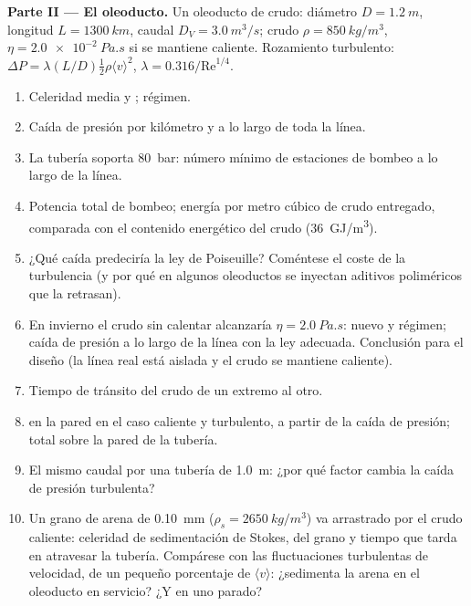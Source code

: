 \begin{problem}
\medskip
\noindent\textbf{Parte II --- El oleoducto.}
Un oleoducto de crudo: diámetro $D = \qty{1.2}{m}$, longitud $L = \qty{1300}{km}$,
caudal $D_V = \qty{3.0}{m^3/s}$; crudo $\rho = \qty{850}{kg/m^3}$, $\eta =
\qty{2.0e-2}{Pa.s}$ si se mantiene caliente. Rozamiento turbulento: $\Delta P = \lambda
(L/D)\tfrac12\rho\langle v\rangle^2$, $\lambda = 0.316/\mathrm{Re}^{1/4}$.
\begin{enumerate}[resume]
  \item Celeridad media y ; régimen.
  \item Caída de presión por kilómetro y a lo largo de toda la línea.
  \item La tubería soporta \qty{80}{bar}: número mínimo de estaciones de
        bombeo a lo largo de la línea.
  \item Potencia total de bombeo; energía por metro cúbico de crudo
        entregado, comparada con el contenido energético del crudo
        (\qty{36}{GJ/m^3}).
  \item ¿Qué caída predeciría la ley de Poiseuille? Coméntese el coste de
        la turbulencia (y por qué en algunos oleoductos se inyectan
        aditivos poliméricos que la retrasan).
  \item En invierno el crudo sin calentar alcanzaría $\eta = \qty{2.0}{Pa.s}$:
        nuevo  y régimen; caída de presión a lo largo de
        la línea con la ley adecuada. Conclusión para el diseño (la línea
        real está aislada y el crudo se mantiene caliente).
  \item Tiempo de tránsito del crudo de un extremo al otro.
  \item {} en la pared en el caso caliente y turbulento, a
        partir de la caída de presión;  total sobre la
        pared de la tubería.
  \item El mismo caudal por una tubería de \qty{1.0}{m}: ¿por qué factor
        cambia la caída de presión turbulenta?
  \item Un grano de arena de \qty{0.10}{mm} ($\rho_s = \qty{2650}{kg/m^3}$) va
        arrastrado por el crudo caliente: celeridad de sedimentación de
        Stokes,  del grano y tiempo que tarda en
        atravesar la tubería. Compárese con las fluctuaciones turbulentas
        de velocidad, de un pequeño porcentaje de $\langle v
        \rangle$: ¿sedimenta la arena en el oleoducto en servicio? ¿Y en
        uno parado?
\end{enumerate}


\end{problem}
